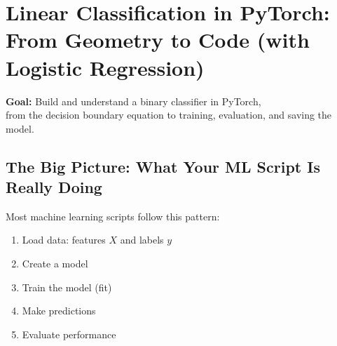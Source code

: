 
\chapter{Linear Classification in PyTorch: From Geometry to Code (with Logistic Regression)}

\begin{center}
{\Large \color{blue!70!black}\textbf{Goal:}} \; Build and understand a binary classifier in PyTorch, \\
from the decision boundary equation to training, evaluation, and saving the model.
\end{center}

\vspace{0.5em}




\section{The Big Picture: What Your ML Script Is Really Doing}

Most machine learning scripts follow this pattern:

\begin{tcolorbox}[title=\textbf{\color{blue!70!black}Standard workflow (high-level)}]
\begin{enumerate}[leftmargin=*]
  \item Load data: features $X$ and labels $y$
  \item Create a model
  \item Train the model (fit)
  \item Make predictions
  \item Evaluate performance
\end{enumerate}
\end{tcolorbox}

